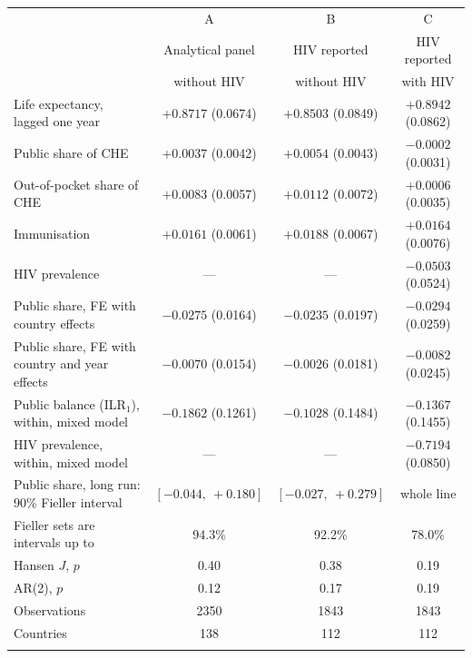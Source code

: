 \begin{tabular}{@{\extracolsep\fill}lccc@{}}
\toprule
& A & B & C \\
& Analytical panel & HIV reported & HIV reported \\
& without HIV & without HIV & with HIV \\
\midrule
Life expectancy, lagged one year & $+0.8717$ (0.0674) & $+0.8503$ (0.0849) & $+0.8942$ (0.0862) \\
Public share of CHE & $+0.0037$ (0.0042) & $+0.0054$ (0.0043) & $-0.0002$ (0.0031) \\
Out-of-pocket share of CHE & $+0.0083$ (0.0057) & $+0.0112$ (0.0072) & $+0.0006$ (0.0035) \\
Immunisation & $+0.0161$ (0.0061) & $+0.0188$ (0.0067) & $+0.0164$ (0.0076) \\
HIV prevalence & --- & --- & $-0.0503$ (0.0524) \\
Public share, FE with country effects & $-0.0275$ (0.0164) & $-0.0235$ (0.0197) & $-0.0294$ (0.0259) \\
Public share, FE with country and year effects & $-0.0070$ (0.0154) & $-0.0026$ (0.0181) & $-0.0082$ (0.0245) \\
Public balance (ILR$_1$), within, mixed model & $-0.1862$ (0.1261) & $-0.1028$ (0.1484) & $-0.1367$ (0.1455) \\
HIV prevalence, within, mixed model & --- & --- & $-0.7194$ (0.0850) \\
\midrule
Public share, long run: 90\% Fieller interval & $[-0.044,\ +0.180]$ & $[-0.027,\ +0.279]$ & whole line \\
Fieller sets are intervals up to & 94.3\% & 92.2\% & 78.0\% \\
Hansen $J$, $p$ & 0.40 & 0.38 & 0.19 \\
AR(2), $p$ & 0.12 & 0.17 & 0.19 \\
Observations & 2350 & 1843 & 1843 \\
Countries & 138 & 112 & 112 \\
\botrule
\end{tabular}
